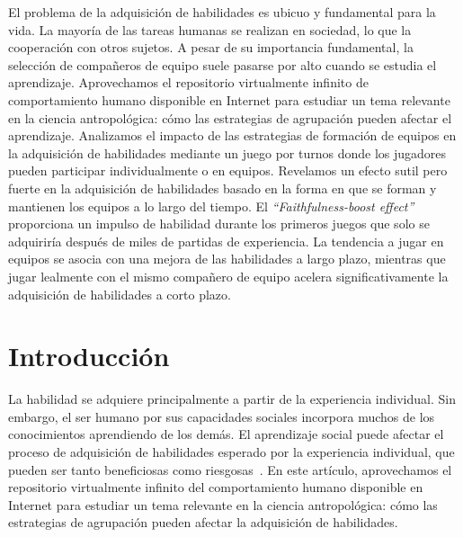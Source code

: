 \documentclass[a4paper,11pt]{book}
\theoremstyle{definition}
\begin{document}
El problema de la adquisici\'on de habilidades es ubicuo y fundamental para la vida.
%
La mayor\'ia de las tareas humanas se realizan en sociedad, lo que  la cooperaci\'on con otros sujetos.
%
A pesar de su importancia fundamental, la selecci\'on de compa\~neros de equipo suele pasarse por alto cuando se estudia el aprendizaje.
%
Aprovechamos el repositorio virtualmente infinito de comportamiento humano disponible en Internet para estudiar un tema relevante en la ciencia antropol\'ogica: c\'omo las estrategias de agrupaci\'on pueden afectar el aprendizaje.
%
Analizamos el impacto de las estrategias de formaci\'on de equipos en la adquisici\'on de habilidades mediante un juego por turnos donde los jugadores pueden participar individualmente o en equipos.
%
Revelamos un efecto sutil pero fuerte en la adquisici\'on de habilidades basado en la forma en que se forman y mantienen los equipos a lo largo del tiempo.
%
El \emph{``Faithfulness-boost effect''} proporciona un impulso de habilidad durante los primeros juegos que solo se adquirir\'ia despu\'es de miles de partidas de experiencia.
%
La tendencia a jugar en equipos se asocia con una mejora de las habilidades a largo plazo, mientras que jugar lealmente con el mismo compa\~nero de equipo acelera significativamente la adquisici\'on de habilidades a corto plazo.

\section{Introducci\'on}

La habilidad se adquiere principalmente a partir de la experiencia individual.
%
Sin embargo, el ser humano por sus capacidades sociales incorpora muchos de los conocimientos aprendiendo de los dem\'as.
%
El aprendizaje social puede afectar el proceso de adquisici\'on de habilidades esperado por la experiencia individual, que pueden ser tanto beneficiosas como riesgosas~\cite{Boyd2011}.
%
En este art\'iculo, aprovechamos el repositorio virtualmente infinito del comportamiento humano disponible en Internet para estudiar un tema relevante en la ciencia antropol\'ogica: c\'omo las estrategias de agrupaci\'on pueden afectar la adquisici\'on de habilidades.

\end{document}
